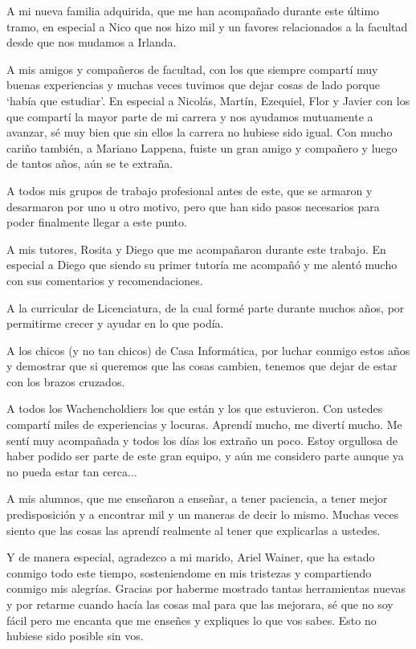 \documentclass[a4paper]{article}
\begin{document}
A mi nueva familia adquirida, que me han acompañado durante este último tramo, en especial a Nico que nos hizo mil y un favores relacionados a la facultad desde que nos mudamos a Irlanda.

A mis amigos y compañeros de facultad, con los que siempre compartí muy buenas experiencias y muchas veces tuvimos que dejar cosas de lado porque `había que estudiar'. En especial a Nicolás, Martín, Ezequiel, Flor y Javier con los que compartí la mayor parte de mi carrera y nos ayudamos mutuamente a avanzar, sé muy bien que sin ellos la carrera no hubiese sido igual. Con mucho cariño también, a Mariano Lappena, fuiste un gran amigo y compañero y luego de tantos años, aún se te extraña.

A todos mis grupos de trabajo profesional antes de este, que se armaron y desarmaron por uno u otro motivo, pero que han sido pasos necesarios para poder finalmente llegar a este punto.

A mis tutores, Rosita y Diego que me acompañaron durante este trabajo. En especial a Diego que siendo su primer tutoría me acompañó y me alentó mucho con sus comentarios y recomendaciones.

A la curricular de Licenciatura, de la cual formé parte durante muchos años, por permitirme crecer y ayudar en lo que podía.

A los chicos (y no tan chicos) de Casa Informática, por luchar conmigo estos años y demostrar que si queremos que las cosas cambien, tenemos que dejar de estar con los brazos cruzados.

A todos los Wachencholdiers los que están y los que estuvieron. Con ustedes compartí miles de experiencias y locuras. Aprendí mucho, me divertí mucho. Me sentí muy acompañada y todos los días los extraño un poco. Estoy orgullosa de haber podido ser parte de este gran equipo, y aún me considero parte aunque ya no pueda estar tan cerca...

A mis alumnos, que me enseñaron a enseñar, a tener paciencia, a tener mejor predisposición y a encontrar mil y un maneras de decir lo mismo. Muchas veces siento que las cosas las aprendí realmente al tener que explicarlas a ustedes.

Y de manera especial, agradezco a mi marido, Ariel Wainer, que ha estado conmigo todo este tiempo, sosteniendome en mis tristezas y compartiendo conmigo mis alegrías. Gracias por haberme mostrado tantas herramientas nuevas y por retarme cuando hacía las cosas mal para que las mejorara, sé que no soy fácil pero me encanta que me enseñes y expliques lo que vos sabes. Esto no hubiese sido posible sin vos.
\end{document}

